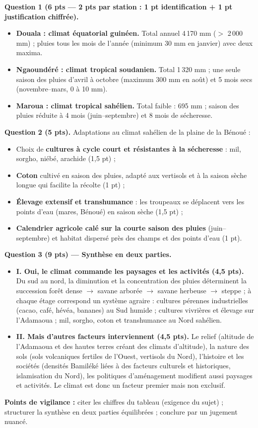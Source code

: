\documentclass[11pt]{article}
\begin{document}
\begin{corrige}
\textbf{Question 1 (6 pts — 2 pts par station : 1 pt identification + 1 pt justification chiffrée).}
\begin{itemize}
\item \textbf{Douala : climat équatorial guinéen.} Total annuel 4\,170 mm ($>$ 2\,000 mm) ; pluies tous les mois de l'année (minimum 30 mm en janvier) avec deux maxima.
\item \textbf{Ngaoundéré : climat tropical soudanien.} Total 1\,320 mm ; une seule saison des pluies d'avril à octobre (maximum 300 mm en août) et 5 mois secs (novembre--mars, 0 à 10 mm).
\item \textbf{Maroua : climat tropical sahélien.} Total faible : 695 mm ; saison des pluies réduite à 4 mois (juin--septembre) et 8 mois de sécheresse.
\end{itemize}
\textbf{Question 2 (5 pts).} Adaptations au climat sahélien de la plaine de la Bénoué :
\begin{itemize}
\item Choix de \textbf{cultures à cycle court et résistantes à la sécheresse} : mil, sorgho, niébé, arachide (1,5 pt) ;
\item \textbf{Coton} cultivé en saison des pluies, adapté aux vertisols et à la saison sèche longue qui facilite la récolte (1 pt) ;
\item \textbf{Élevage extensif et transhumance} : les troupeaux se déplacent vers les points d'eau (mares, Bénoué) en saison sèche (1,5 pt) ;
\item \textbf{Calendrier agricole calé sur la courte saison des pluies} (juin--septembre) et habitat dispersé près des champs et des points d'eau (1 pt).
\end{itemize}
\textbf{Question 3 (9 pts) — Synthèse en deux parties.}
\begin{itemize}
\item \textbf{I. Oui, le climat commande les paysages et les activités (4,5 pts).} Du sud au nord, la diminution et la concentration des pluies déterminent la succession forêt dense $\rightarrow$ savane arborée $\rightarrow$ savane herbeuse $\rightarrow$ steppe ; à chaque étage correspond un système agraire : cultures pérennes industrielles (cacao, café, hévéa, bananes) au Sud humide ; cultures vivrières et élevage sur l'Adamaoua ; mil, sorgho, coton et transhumance au Nord sahélien.
\item \textbf{II. Mais d'autres facteurs interviennent (4,5 pts).} Le relief (altitude de l'Adamaoua et des hautes terres créant des climats d'altitude), la nature des sols (sols volcaniques fertiles de l'Ouest, vertisols du Nord), l'histoire et les sociétés (densités Bamiléké liées à des facteurs culturels et historiques, islamisation du Nord), les politiques d'aménagement modifient aussi paysages et activités. Le climat est donc un facteur premier mais non exclusif.
\end{itemize}
\textbf{Points de vigilance :} citer les chiffres du tableau (exigence du sujet) ; structurer la synthèse en deux parties équilibrées ; conclure par un jugement nuancé.
\end{corrige}
\end{document}
